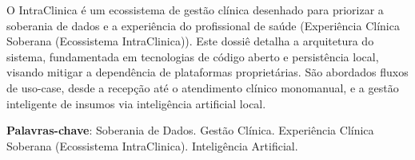 \documentclass[
	12pt,				%
	openright,			%
	oneside,			%
	a4paper,			%
	english,			%
	brazil				%
	]{abntex2}
\begin{document}
\frenchspacing 

\imprimircapa

\imprimirfolhaderosto

\begin{resumo}
 O IntraClinica é um ecossistema de gestão clínica desenhado para priorizar a soberania de dados e a experiência do profissional de saúde (Experiência Clínica Soberana (Ecossistema IntraClinica)). Este dossiê detalha a arquitetura do sistema, fundamentada em tecnologias de código aberto e persistência local, visando mitigar a dependência de plataformas proprietárias. São abordados fluxos de uso-case, desde a recepção até o atendimento clínico monomanual, e a gestão inteligente de insumos via inteligência artificial local.
 
 \vspace{\onelineskip}
 \noindent
 \textbf{Palavras-chave}: Soberania de Dados. Gestão Clínica. Experiência Clínica Soberana (Ecossistema IntraClinica). Inteligência Artificial.
\end{resumo}

\tableofcontents*
\cleardoublepage

\textual








\postextual

\apendices

\end{document}
